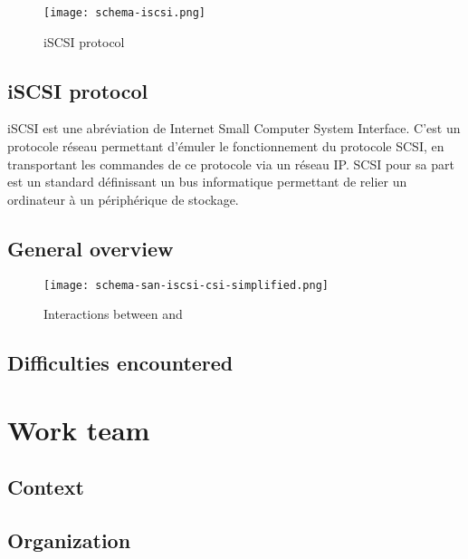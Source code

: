 \begin{figure}[h]
    \centering
    \texttt{[image: schema-iscsi.png]}
    \caption{iSCSI protocol}
\end{figure}
\color{black}

\subsection{iSCSI protocol}

\color{darkgreen}
iSCSI est une abréviation de Internet Small Computer System Interface. C'est un protocole réseau permettant d'émuler le fonctionnement du protocole SCSI, en transportant les commandes de ce protocole via un réseau IP. SCSI pour sa part est un standard définissant un bus informatique permettant de relier un ordinateur à un périphérique de stockage.
\color{black}

\subsection{General overview}

\color{darkgreen}

\begin{figure}[h]
    \centering
    \texttt{[image: schema-san-iscsi-csi-simplified.png]}
    \caption{Interactions between  and \saniscsicsi}
\end{figure}

\color{black}

\subsection{Difficulties encountered}

\section{Work team}
\subsection{Context}
\subsection{Organization}

\clearpage
